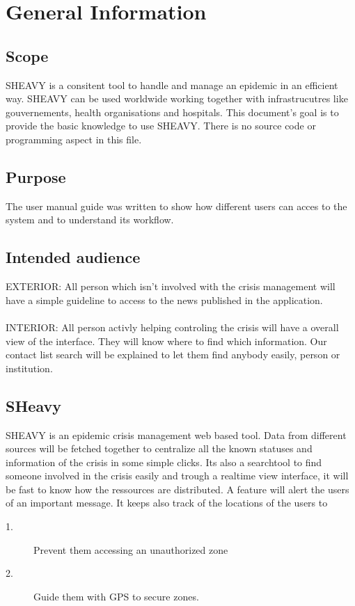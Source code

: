 \chapter{General Information}

\label{chap:introduction}

\section{Scope}
SHEAVY is a consitent tool to handle and manage an epidemic in an efficient way.
SHEAVY can be used worldwide working together with infrastrucutres like
gouvernements, health organisations and hospitals. This document's goal is to
provide the basic knowledge to use SHEAVY. There is no source code or
programming aspect in this file. \\

\section{Purpose}
The user manual guide was written to show how different users can acces to the
system and to understand its workflow.\\



\section{Intended audience}
EXTERIOR: All person which isn't involved with the crisis management will have a
simple guideline to access to the news published in the application.\\
\\
INTERIOR: All person activly helping controling the crisis will have a overall
view of the interface. They will know where to find which information. Our
contact list search will be explained to let them find anybody easily, person or
institution.\\

\section{SHeavy}
SHEAVY is an epidemic crisis management web based tool. Data from different
sources will be fetched together to centralize all the known statuses and
information of the crisis in some simple clicks. Its also a searchtool to find
someone involved in the crisis easily and trough a realtime view interface, it
will be fast to know how the ressources are distributed. A feature will alert
the users of an important message. It keeps also track of the locations of the
users to\\
\begin{description}
 \item[1.] Prevent them accessing an unauthorized zone
 \item[2.] Guide them with GPS to secure zones.
\end{description}

